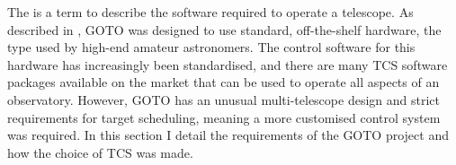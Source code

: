 
\begin{colsection}

The  is a term to describe the software required to operate a telescope. As described in , GOTO was designed to use standard, off-the-shelf hardware, the type used by high-end amateur astronomers. The control software for this hardware has increasingly been standardised, and there are many TCS software packages available on the market that can be used to operate all aspects of an observatory. However, GOTO has an unusual multi-telescope design and strict requirements for target scheduling, meaning a more customised control system was required. In this section I detail the requirements of the GOTO project and how the choice of TCS was made.

\end{colsection}



